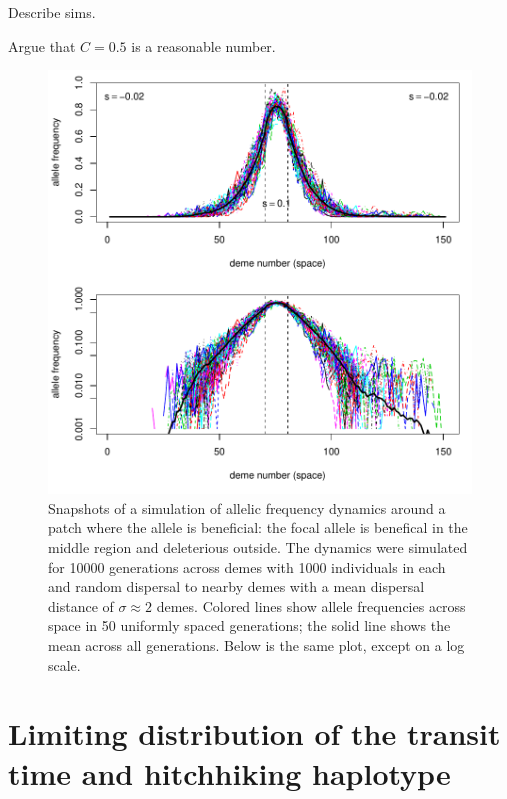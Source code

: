 \documentclass{article}
\begin{document}
Describe sims.

Argue that $C=0.5$ is a reasonable number.

\begin{figure}[ht!]
    \begin{center}
        \includegraphics{example-equilibrium}
    \end{center}
    \label{fig:example_equil}
    \caption{
    Snapshots of a simulation of allelic frequency dynamics around a patch where the allele is beneficial:
    the focal allele is benefical in the middle region and deleterious outside.
    The dynamics were simulated for 10000 generations across demes with 1000 individuals in each
    and random dispersal to nearby demes with a mean dispersal distance of $\sigma \approx 2$ demes.
    Colored lines show allele frequencies across space in 50 uniformly spaced generations;
    the solid line shows the mean across all generations.
    Below is the same plot, except on a log scale.
    }
\end{figure}


\section{Limiting distribution of the transit time and hitchhiking haplotype}
\label{apx:limiting_dist_of_HH_haplotype}
\end{document}
